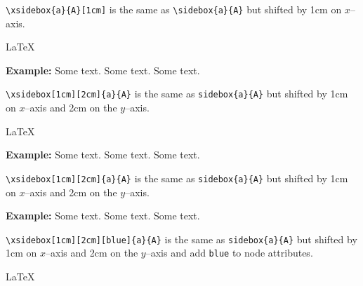 \documentclass[a4paper,
               openany,oneside,chapterprefix,
               12pt,
               parskip=full]
              {scrbook}
\newcommand\sidebox[3][0cm]{
  \renewcommand*{\marginfont}{\normalsize}
  \marginpar{\centering%
      \vspace{#1} %
      \begin{tikzpicture}[overlay,remember picture, baseline=(#2.base)]
        \node[rectangle, draw=red, text width=4cm, minimum width=2cm, line width=0.1cm, inner sep=0.2cm, name=#2] (#2) 
             {
               \begin{minipage}[t]{4.0cm}
                 {#3}
               \end{minipage}
             };
      \end{tikzpicture}
    \renewcommand*{\marginfont}{\tiny}
}}
\renewcommand*{\marginfont}{\normalsize}
\renewcommand*{\marginfont}{\tiny}
\begin{document}
\verb!\xsidebox{a}{A}[1cm]! is the same as \verb!\sidebox{a}{A}! but
shifted by 1cm on $x$--axis.



\LaTeX
\begin{console}

\end{console}


\newpage
\textbf{Example:} Some text. Some text. Some text.

\verb!\xsidebox[1cm][2cm]{a}{A}! is the same as \verb!sidebox{a}{A}! but
shifted by 1cm on $x$--axis and 2cm on the $y$--axis.



\LaTeX
\begin{console}

\end{console}

\newpage
\textbf{Example:} Some text. Some text. Some text.

\verb!\xsidebox[1cm][2cm]{a}{A}! is the same as \verb!sidebox{a}{A}! but
shifted by 1cm on $x$--axis and 2cm on the $y$--axis.



\newpage
\textbf{Example:} Some text. Some text. Some text.

\verb!\xsidebox[1cm][2cm][blue]{a}{A}! is the same as \verb!sidebox{a}{A}! but
shifted by 1cm on $x$--axis and 2cm on the $y$--axis
and add \verb!blue! to node attributes.



\LaTeX
\begin{console}

\end{console}
\end{document}
